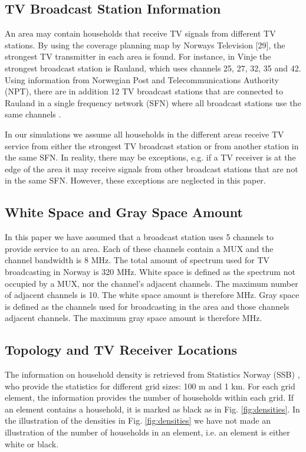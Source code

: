 \documentclass[journal,11pt,draftclsnofoot,onecolumn]{IEEEtran}
\begin{document}
\subsection{TV Broadcast Station Information}
An area may contain households that receive TV signals from different TV stations. By using the coverage planning map by Norways Television [29], the strongest TV transmitter in each area is found. For instance, in Vinje the strongest broadcast station is Rauland, which uses channels 25, 27, 32, 35 and 42. Using information from Norwegian Post and Telecommunications Authority (NPT), there are in addition 12 TV broadcast stations that are connected to Rauland in a single frequency network (SFN) where all broadcast stations use the same channels \cite{npt}. 

In our simulations we assume all households in the different areas receive TV service from either the strongest TV broadcast station or from another station in the same SFN. In reality, there may be exceptions, e.g. if a TV receiver is at the edge of the area it may receive signals from other broadcast stations that are not in the same SFN. However, these exceptions are neglected in this paper.

\subsection{White Space and Gray Space Amount}
In this paper we have assumed that a broadcast station uses 5 channels to provide service to an area. Each of these channels contain a MUX and the channel bandwidth is 8 MHz. The total amount of spectrum used for TV broadcasting in Norway is 320 MHz. White space is defined as the spectrum not occupied by a MUX, nor the channel's adjacent channels. The maximum number of adjacent channels is 10. The white space amount is therefore  MHz. Gray space is defined as the channels used for broadcasting in the area and those channels adjacent channels. The maximum gray space amount is therefore  MHz.

\subsection{Topology and TV Receiver Locations}
The information on household density is retrieved from Statistics Norway (SSB) \cite{ssb}, who provide the statistics for different grid sizes: 100 m and 1 km. For each grid element, the information provides the number of households within each grid. If an element contains a household, it is marked as black as in Fig. \ref{fig:densities}. In the illustration of the densities in Fig. \ref{fig:densities} we have not made an illustration of the number of households in an element, i.e. an element is either white or black.
\end{document}
